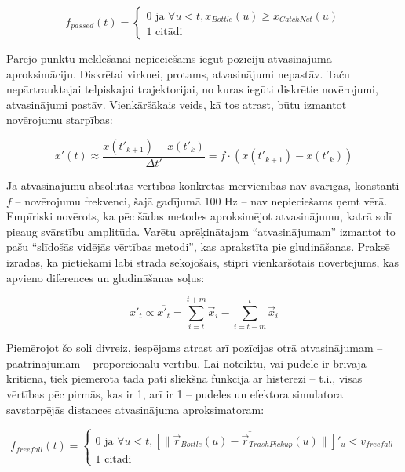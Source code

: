 \documentclass[12pt, a4paper]{article}
\numberwithin{equation}{section} %
\begin{document}
\begin{equation}
    f_{passed} (t) = \begin{cases}
        0 \text{ ja } \forall u < t, x_{Bottle}(u) \geq x_{CatchNet}(u) \\
        1 \text{ citādi }
    \end{cases}
\end{equation}

Pārējo punktu meklēšanai nepieciešams iegūt pozīciju atvasinājuma aproksimāciju. Diskrētai virknei, protams, atvasinājumi nepastāv. Taču nepārtrauktajai telpiskajai trajektorijai, no kuras iegūti diskrētie novērojumi, atvasinājumi pastāv. Vienkāršākais veids, kā tos atrast, būtu izmantot novērojumu starpības:

\begin{equation}
    x'(t) \approx \frac{x(t'_{k+1}) - x(t'_{k})}{\Delta t'} = f \cdot \left (x(t'_{k+1}) - x(t'_{k}) \right )
\end{equation}

Ja atvasinājumu absolūtās vērtības konkrētās mērvienībās nav svarīgas, konstanti $f$ -- novērojumu frekvenci, šajā gadījumā $100$ Hz -- nav nepieciešams ņemt vērā. Empīriski novērots, ka pēc šādas metodes aproksimējot atvasinājumu, katrā solī pieaug svārstību amplitūda. Varētu aprēķinātajam ``atvasinājumam'' izmantot to pašu ``slīdošās vidējās vērtības metodi'', kas aprakstīta pie gludināšanas. Praksē izrādās, ka pietiekami labi strādā sekojošais, stipri vienkāršotais novērtējums, kas apvieno diferences un gludināšanas soļus:

\begin{equation}
    x'_t \propto \overline{x'_t} = \sum_{i=t}^{t+m} \vec{x}_i - \sum_{i=t-m}^{t} \vec{x}_i
\end{equation}

Piemērojot šo soli divreiz, iespējams atrast arī pozīcijas otrā atvasinājumam -- paātrinājumam -- proporcionālu vērtību. Lai noteiktu, vai pudele ir brīvajā kritienā, tiek piemērota tāda pati sliekšņa funkcija ar histerēzi -- t.i., visas vērtības pēc pirmās, kas ir 1, arī ir 1 -- pudeles un efektora simulatora savstarpējās distances atvasinājuma aproksimatoram:


\begin{equation}
    f_{freefall} (t) = \begin{cases}
        0 \text{ ja } \forall u < t,  \overline{ \left [ \lVert \vec{r}_{Bottle}(u) - \vec{r}_{TrashPickup}(u)  \rVert \right ] '_u} < \overline{v}_{freefall} \\
        1 \text{ citādi }
    \end{cases}
\end{equation}
\end{document}
